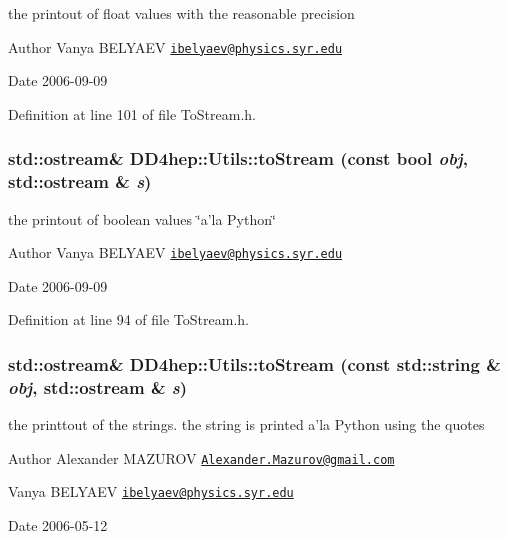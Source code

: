 the printout of float values with the reasonable precision \begin{DoxyAuthor}{Author}
Vanya BELYAEV \href{mailto:ibelyaev@physics.syr.edu}{\tt ibelyaev@physics.syr.edu} 
\end{DoxyAuthor}
\begin{DoxyDate}{Date}
2006-\/09-\/09 
\end{DoxyDate}


Definition at line 101 of file ToStream.h.\hypertarget{namespace_d_d4hep_1_1_utils_a4f1e298302e413af8ba3059d36f85336}{
\subsubsection[{toStream}]{\setlength{\rightskip}{0pt plus 5cm}std::ostream\& DD4hep::Utils::toStream (const bool {\em obj}, \/  std::ostream \& {\em s})}}
\label{namespace_d_d4hep_1_1_utils_a4f1e298302e413af8ba3059d36f85336}


the printout of boolean values \char`\"{}a'la Python\char`\"{} \begin{DoxyAuthor}{Author}
Vanya BELYAEV \href{mailto:ibelyaev@physics.syr.edu}{\tt ibelyaev@physics.syr.edu} 
\end{DoxyAuthor}
\begin{DoxyDate}{Date}
2006-\/09-\/09 
\end{DoxyDate}


Definition at line 94 of file ToStream.h.\hypertarget{namespace_d_d4hep_1_1_utils_aa018a120e53fa6edbb44f423a31baa21}{
\subsubsection[{toStream}]{\setlength{\rightskip}{0pt plus 5cm}std::ostream\& DD4hep::Utils::toStream (const std::string \& {\em obj}, \/  std::ostream \& {\em s})}}
\label{namespace_d_d4hep_1_1_utils_aa018a120e53fa6edbb44f423a31baa21}


the printtout of the strings. the string is printed a'la Python using the quotes \begin{DoxyAuthor}{Author}
Alexander MAZUROV \href{mailto:Alexander.Mazurov@gmail.com}{\tt Alexander.Mazurov@gmail.com} 

Vanya BELYAEV \href{mailto:ibelyaev@physics.syr.edu}{\tt ibelyaev@physics.syr.edu} 
\end{DoxyAuthor}
\begin{DoxyDate}{Date}
2006-\/05-\/12 
\end{DoxyDate}


